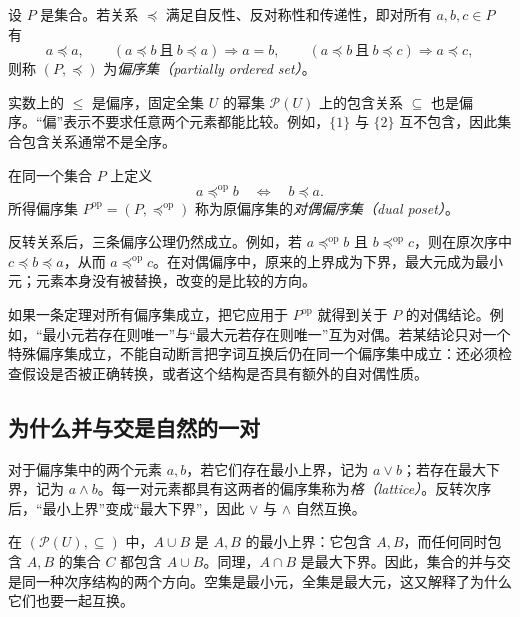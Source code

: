 \documentclass[UTF8,12pt,a4paper,fontset=fandol]{ctexart}
\begin{document}
\begin{definition}[偏序]
设 $P$ 是集合。若关系 $\preceq$ 满足自反性、反对称性和传递性，即对所有 $a,b,c\in P$ 有
\[
 a\preceq a,\qquad
 (a\preceq b\ \text{且}\ b\preceq a)\Longrightarrow a=b,
 \qquad
 (a\preceq b\ \text{且}\ b\preceq c)\Longrightarrow a\preceq c,
\]
则称 $(P,\preceq)$ 为\emph{偏序集（partially ordered set）}。
\end{definition}

实数上的 $\leq$ 是偏序，固定全集 $U$ 的幂集 $\mathcal P(U)$ 上的包含关系 $\subseteq$ 也是偏序。“偏”表示不要求任意两个元素都能比较。例如，$\{1\}$ 与 $\{2\}$ 互不包含，因此集合包含关系通常不是全序。

\begin{definition}[对偶偏序]
在同一个集合 $P$ 上定义
\[
 a\preceq^{\mathrm{op}} b\quad\Longleftrightarrow\quad b\preceq a.
\]
所得偏序集 $P^{\mathrm{op}}=(P,\preceq^{\mathrm{op}})$ 称为原偏序集的\emph{对偶偏序集（dual poset）}。
\end{definition}

反转关系后，三条偏序公理仍然成立。例如，若 $a\preceq^{\mathrm{op}}b$ 且 $b\preceq^{\mathrm{op}}c$，则在原次序中 $c\preceq b\preceq a$，从而 $a\preceq^{\mathrm{op}}c$。在对偶偏序中，原来的上界成为下界，最大元成为最小元；元素本身没有被替换，改变的是比较的方向。

\begin{remark}[定理的适用对象也要随之转换]
如果一条定理对所有偏序集成立，把它应用于 $P^{\mathrm{op}}$ 就得到关于 $P$ 的对偶结论。例如，“最小元若存在则唯一”与“最大元若存在则唯一”互为对偶。若某结论只对一个特殊偏序集成立，不能自动断言把字词互换后仍在同一个偏序集中成立：还必须检查假设是否被正确转换，或者这个结构是否具有额外的自对偶性质。
\end{remark}

\subsection{为什么并与交是自然的一对}

对于偏序集中的两个元素 $a,b$，若它们存在最小上界，记为 $a\vee b$；若存在最大下界，记为 $a\wedge b$。每一对元素都具有这两者的偏序集称为\emph{格（lattice）}。反转次序后，“最小上界”变成“最大下界”，因此 $\vee$ 与 $\wedge$ 自然互换。

在 $(\mathcal P(U),\subseteq)$ 中，$A\cup B$ 是 $A,B$ 的最小上界：它包含 $A,B$，而任何同时包含 $A,B$ 的集合 $C$ 都包含 $A\cup B$。同理，$A\cap B$ 是最大下界。因此，集合的并与交是同一种次序结构的两个方向。空集是最小元，全集是最大元，这又解释了为什么它们也要一起互换。
\end{document}
